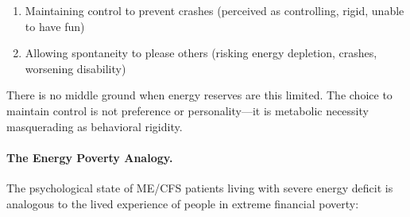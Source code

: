 \begin{enumerate}
    \item Maintaining control to prevent crashes (perceived as controlling, rigid, unable to have fun)
    \item Allowing spontaneity to please others (risking energy depletion, crashes, worsening disability)
\end{enumerate}

There is no middle ground when energy reserves are this limited. The choice to maintain control is not preference or personality---it is metabolic necessity masquerading as behavioral rigidity.

\paragraph{The Energy Poverty Analogy.}
The psychological state of ME/CFS patients living with severe energy deficit is analogous to the lived experience of people in extreme financial poverty:

